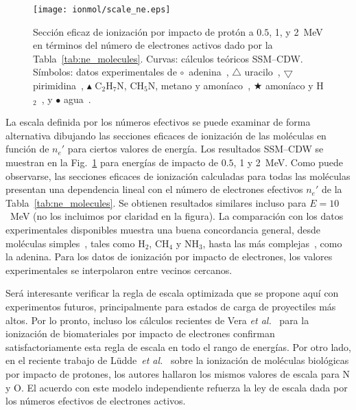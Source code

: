 \begin{figure}[t]
\centering
\texttt{[image: ionmol/scale\_ne.eps]}
\caption[Ionización por impacto de protón en términos de $n_e'$.]
{Sección eficaz de ionización por impacto de protón a $0.5$, 1, y 2~MeV 
en términos del número de electrones activos dado por la 
Tabla~\ref{tab:ne_molecules}. Curvas: cálculos teóricos SSM--CDW. 
Símbolos: datos experimentales de 
\mbox{\Large$\circ$}~adenina~\cite{Iriki:11}, 
$\triangle$ uracilo~\cite{itoh2013}, 
$\bigtriangledown$ pirimidina~\cite{wolff2014}, 
$\blacktriangle$ C$_2$H$_7$N, CH$_5$N, metano y amoníaco~\cite{Lynch:76},
\mbox{\scriptsize$\bigstar$} amoníaco y H$_2$~\cite{Rudd:85}, y 
\mbox{\Large$\bullet$} agua~\cite{Luna2007}.}
\label{fig:recta}
\end{figure}

La escala definida por los números efectivos se puede examinar de forma 
alternativa dibujando las secciones eficaces de ionización de las 
moléculas en función de $n_e'$ para ciertos valores de energía. Los 
resultados SSM--CDW se muestran en la Fig.~\ref{fig:recta} para 
energías de impacto de $0.5$, 1 y 2~MeV. Como puede observarse, las 
secciones eficaces de ionización calculadas para todas las moléculas 
presentan una dependencia lineal con el número de electrones efectivos 
$n_e'$ de la Tabla~\ref{tab:ne_molecules}. Se obtienen resultados 
similares incluso para $E=10$~MeV (no los incluimos por claridad en la 
figura). La comparación con los datos experimentales disponibles muestra 
una buena concordancia general, desde moléculas simples~\cite{Lynch:76,
Rudd:85,Luna2007}, tales como H$_2$, CH$_4$ y NH$_3$, hasta las más 
complejas~\cite{Iriki:11,itoh2013,wolff2014}, como la adenina. Para los 
datos de ionización por impacto de electrones, los valores 
experimentales se interpolaron entre vecinos cercanos. 

Será interesante verificar la regla de escala optimizada que se propone
aquí con experimentos futuros, principalmente para estados de carga de 
proyectiles más altos. Por lo pronto, incluso los cálculos recientes 
de Vera \textit{et al.}~\cite{deVera:20} para la ionización de 
biomateriales por impacto de electrones confirman satisfactoriamente
esta regla de escala en todo el rango de energías. Por otro lado, en el 
reciente trabajo de L\"udde~\textit{et al.}~\cite{Ludde:19} sobre la 
ionización de moléculas biológicas por impacto de protones, los autores 
hallaron los mismos valores de escala para N y O. El acuerdo con este 
modelo independiente refuerza la ley de escala dada por los números 
efectivos de electrones activos.

